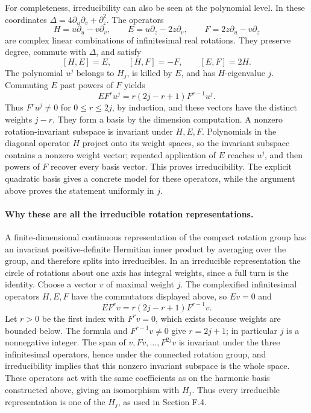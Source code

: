 \documentclass[11pt,a4paper]{article}
\begin{document}
For completeness, irreducibility can also be seen at the polynomial level. In these coordinates \(\Delta=4\partial_u\partial_v+\partial_z^2\). The operators
\[
H=u\partial_u-v\partial_v,\qquad
E=u\partial_z-2z\partial_v,\qquad
F=2z\partial_u-v\partial_z
\]
are complex linear combinations of infinitesimal real rotations. They preserve degree, commute with \(\Delta\), and satisfy
\[
[H,E]=E,\qquad[H,F]=-F,\qquad[E,F]=2H.
\]
The polynomial \(u^j\) belongs to \(H_j\), is killed by \(E\), and has \(H\)-eigenvalue \(j\). Commuting \(E\) past powers of \(F\) yields
\[
E F^r u^j=r(2j-r+1)F^{r-1}u^j.
\]
Thus \(F^r u^j\ne0\) for \(0\leq r\leq2j\), by induction, and these vectors have the distinct weights \(j-r\). They form a basis by the dimension computation. A nonzero rotation-invariant subspace is invariant under \(H,E,F\). Polynomials in the diagonal operator \(H\) project onto its weight spaces, so the invariant subspace contains a nonzero weight vector; repeated application of \(E\) reaches \(u^j\), and then powers of \(F\) recover every basis vector. This proves irreducibility. The explicit quadratic basis gives a concrete model for these operators, while the argument above proves the statement uniformly in \(j\).

\paragraph{Why these are all the irreducible rotation representations.}
A finite-dimensional continuous representation of the compact rotation group has an invariant positive-definite Hermitian inner product by averaging over the group, and therefore splits into irreducibles. In an irreducible representation the circle of rotations about one axis has integral weights, since a full turn is the identity. Choose a vector \(v\) of maximal weight \(j\). The complexified infinitesimal operators \(H,E,F\) have the commutators displayed above, so \(Ev=0\) and
\[
E F^r v=r(2j-r+1)F^{r-1}v.
\]
Let \(r>0\) be the first index with \(F^rv=0\), which exists because weights are bounded below. The formula and \(F^{r-1}v\ne0\) give \(r=2j+1\); in particular \(j\) is a nonnegative integer. The span of \(v,Fv,\ldots,F^{2j}v\) is invariant under the three infinitesimal operators, hence under the connected rotation group, and irreducibility implies that this nonzero invariant subspace is the whole space. These operators act with the same coefficients as on the harmonic basis constructed above, giving an isomorphism with \(H_j\). Thus every irreducible representation is one of the \(H_j\), as used in Section F.4.
\end{document}

